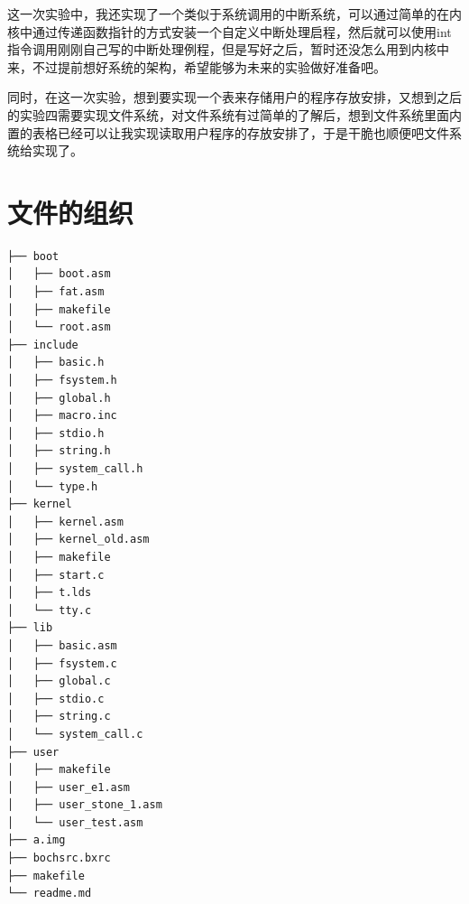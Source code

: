 \documentclass[forprint]{WHUBachelor}
\begin{document}
这一次实验中，我还实现了一个类似于系统调用的中断系统，可以通过简单的在内核中通过传递函数指针的方式安装一个自定义中断处理启程，然后就可以使用int指令调用刚刚自己写的中断处理例程，但是写好之后，暂时还没怎么用到内核中来，不过提前想好系统的架构，希望能够为未来的实验做好准备吧。

同时，在这一次实验，想到要实现一个表来存储用户的程序存放安排，又想到之后的实验四需要实现文件系统，对文件系统有过简单的了解后，想到文件系统里面内置的表格已经可以让我实现读取用户程序的存放安排了，于是干脆也顺便吧文件系统给实现了。







% 










\appendix

\chapter{文件的组织}
\label{code:organization}
\begin{lstlisting}[language={[x86masm]Assembler}] 
├── boot
│   ├── boot.asm
│   ├── fat.asm
│   ├── makefile
│   └── root.asm
├── include
│   ├── basic.h
│   ├── fsystem.h
│   ├── global.h
│   ├── macro.inc
│   ├── stdio.h
│   ├── string.h
│   ├── system_call.h
│   └── type.h
├── kernel
│   ├── kernel.asm
│   ├── kernel_old.asm
│   ├── makefile
│   ├── start.c
│   ├── t.lds
│   └── tty.c
├── lib
│   ├── basic.asm
│   ├── fsystem.c
│   ├── global.c
│   ├── stdio.c
│   ├── string.c
│   └── system_call.c
├── user
│   ├── makefile
│   ├── user_e1.asm
│   ├── user_stone_1.asm
│   └── user_test.asm
├── a.img
├── bochsrc.bxrc
├── makefile
└── readme.md
\end{lstlisting}
\end{document}
